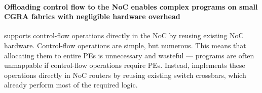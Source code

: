 \paragraph{Offloading control flow to the NoC enables complex programs on small CGRA fabrics with negligible hardware overhead}
\riptidearch supports control-flow operations directly in the NoC by reusing existing NoC hardware.
% 
Control-flow operations are simple, but numerous.
% 
This means that allocating them to entire PEs is unnecessary and wasteful
--- programs are often unmappable if control-flow operations require PEs.
% 
Instead, \riptide implements these operations directly in NoC routers by reusing existing switch crossbars,
which already perform most of the required logic.
